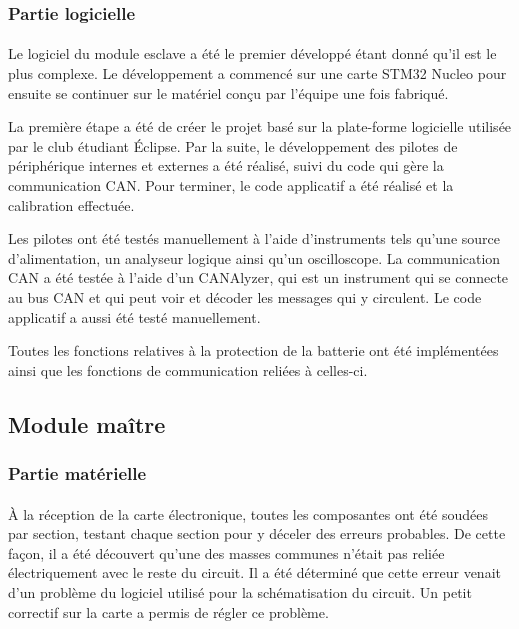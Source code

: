 		\subsubsection{Partie logicielle}

			\paragraph{}
			Le logiciel du module esclave a été le premier développé étant donné qu'il est le plus complexe. Le développement a commencé sur une carte STM32 Nucleo pour ensuite se continuer sur le matériel conçu par l'équipe une fois fabriqué.

			La première étape a été de créer le projet basé sur la plate-forme logicielle utilisée par le club étudiant Éclipse. Par la suite, le développement des pilotes de périphérique internes et externes a été réalisé, suivi du code qui gère la communication CAN. Pour terminer, le code applicatif a été réalisé et la calibration effectuée.

			Les pilotes ont été testés manuellement à l'aide d'instruments tels qu'une source d'alimentation, un analyseur logique ainsi qu'un oscilloscope. La communication CAN a été testée à l'aide d'un CANAlyzer, qui est un instrument qui se connecte au bus CAN et qui peut voir et décoder les messages qui y circulent. Le code applicatif a aussi été testé manuellement.

			Toutes les fonctions relatives à la protection de la batterie ont été implémentées ainsi que les fonctions de communication reliées à celles-ci.



	\subsection{Module maître}

		\subsubsection{Partie matérielle}

			\paragraph{}
			À la réception de la carte électronique, toutes les composantes ont été soudées par section, testant chaque section pour y déceler des erreurs probables. De cette façon, il a été découvert qu’une des masses communes n’était pas reliée électriquement avec le reste du circuit. Il a été déterminé que cette erreur venait d’un problème du logiciel utilisé pour la schématisation du circuit. Un petit correctif sur la carte a permis de régler ce problème.

